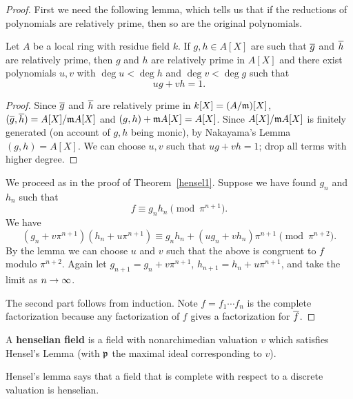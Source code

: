 \begin{proof}
First we need the following lemma, which tells us that if the reductions of polynomials are relatively prime, then so are the original polynomials.
\begin{lem}
Let $A$ be a local ring with residue field $k$. If $g,h\in A[X]$ are such that $\overline{g}$ and $\overline{h}$ are relatively prime, then $g$ and $h$ are relatively prime in $A[X]$ and there exist polynomials $u, v$ with $\deg u<\deg h$ and $\deg v<\deg g$ such that 
\[
ug+vh=1.
\]
\end{lem}
\begin{proof}
Since $\overline{g}$ and $\overline{h}$ are relatively prime in $k[X]=(A/\mathfrak{m})[X]$, $(\overline{g}, \overline{h})=A[X]/\mathfrak{m} A[X]$ and $(g,h)+\mathfrak{m} A[X]=A[X]$. Since $A[X]/\mathfrak{m} A[X]$ is finitely generated (on account of $g,h$ being monic), %
by Nakayama's Lemma $(g,h)=A[X]$. We can choose $u,v$ such that $ug+vh=1$; drop all terms with higher degree.
\end{proof}
We proceed as in the proof of Theorem~\ref{hensel1}. Suppose we have found $g_n$ and $h_n$ such that
\[
f\equiv g_nh_n\pmod{\pi^{n+1}}.
\]
We have
\[
(g_n+v\pi^{n+1})(h_n+u\pi^{n+1})\equiv g_nh_n+(ug_n+vh_n)\pi^{n+1}\pmod{\pi^{n+2}}.
\]
By the lemma we can choose $u$ and $v$ such that the above is congruent to $f$ modulo $\pi^{n+2}$. Again let $g_{n+1}=g_n+v\pi^{n+1}$, $h_{n+1}=h_n+u\pi^{n+1}$, and take the limit as $n\to \infty$.

The second part follows from induction. Note $f=f_1\cdots f_n$ is the complete factorization because any factorization of $f$ gives a factorization for $\overline{f}$.
\end{proof}
\begin{df}
A \textbf{henselian field} is a field with nonarchimedian valuation $v$ which satisfies Hensel's Lemma (with $\mathfrak{p}$ the maximal ideal corresponding to $v$).
\end{df}
Hensel's lemma says that a field that is complete with respect to a discrete valuation is henselian.
